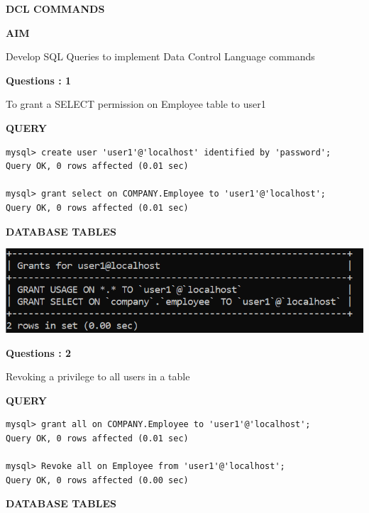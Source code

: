 \documentclass[a4paper,12pt]{report}
\begin{document}
\begin{center}
		\large\textbf{DCL COMMANDS}
	\end{center}
	
	\begin{flushleft}
		\textbf{AIM }
	\end{flushleft} 
	   Develop SQL Queries to implement Data Control Language commands
\begin{flushleft}
    \textbf{Questions : 1}
\end{flushleft}
 To grant a SELECT permission on Employee table to user1
	
	\begin{flushleft}
		\textbf{QUERY }
	\end{flushleft}
\begin{verbatim}
mysql> create user 'user1'@'localhost' identified by 'password';
Query OK, 0 rows affected (0.01 sec)

mysql> grant select on COMPANY.Employee to 'user1'@'localhost';
Query OK, 0 rows affected (0.01 sec)

\end{verbatim}
\begin{flushleft}
		\textbf{DATABASE TABLES} 
\end{flushleft} 

\includegraphics[scale=0.6]{Screenshot (456).png}

\begin{flushleft}
    \textbf{Questions : 2}
\end{flushleft}
Revoking a privilege to all users in a table
	\begin{flushleft}
		\textbf{QUERY }
	\end{flushleft}
\begin{verbatim}
mysql> grant all on COMPANY.Employee to 'user1'@'localhost';
Query OK, 0 rows affected (0.01 sec)

mysql> Revoke all on Employee from 'user1'@'localhost';
Query OK, 0 rows affected (0.00 sec)

\end{verbatim}
\begin{flushleft}
		\textbf{DATABASE TABLES} 
\end{flushleft} 
\end{document}
